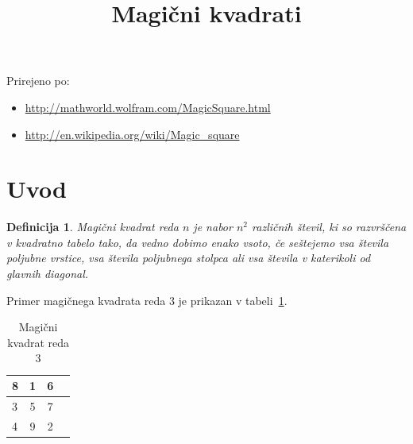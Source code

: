 \documentclass[a4paper,12pt]{article}
\title{Magični kvadrati}
\date{}
\author{}
\newtheorem{definicija}{Definicija}
\begin{document}
\maketitle

Prirejeno po:
%
\begin{itemize}
   \item \url{http://mathworld.wolfram.com/MagicSquare.html}
   \item \url{http://en.wikipedia.org/wiki/Magic_square}
\end{itemize}

\tableofcontents


\newpage

\section{Uvod}

\begin{definicija}
   \emph{Magični kvadrat} reda \(n\) je nabor \(n^2\) različnih števil,
   ki so razvrščena v kvadratno tabelo tako, da vedno dobimo enako vsoto,
   če seštejemo vsa števila poljubne vrstice, vsa števila poljubnega
   stolpca ali vsa števila v katerikoli od glavnih diagonal.
\end{definicija}

Primer magičnega kvadrata reda 3 je prikazan v tabeli~\ref{table:mag3}. %

\begin{table}[!ht]
   \centering
   \caption{Magični kvadrat reda 3}
   \label{table:mag3}
   \large
   \begin{tabular}{|l|c|c|c|}
   \hline
      8 & 1 & 6 \\ \hline
      3 & 5 & 7 \\ \hline
      4 & 9 & 2 \\ \hline
   \end{tabular}
   \normalsize
\end{table}
\end{document}
